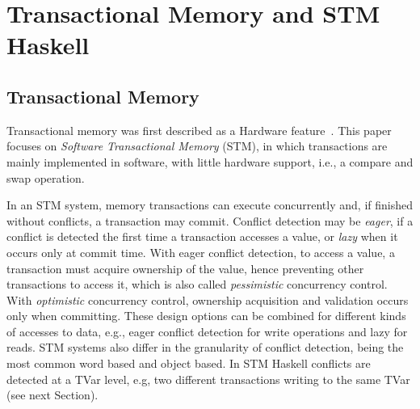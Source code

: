 \documentclass{llncs}
\begin{document}










\section{Transactional Memory and STM Haskell}
\label{sec:stm}
\subsection{Transactional Memory}

Transactional memory was first described as a Hardware feature~\cite{htm}. This paper focuses on
{\it Software Transactional Memory} (STM), in which transactions are mainly implemented
in software, with little hardware support, i.e., a compare and swap operation. 

In an STM system, memory transactions can execute concurrently and, if finished without conflicts, a transaction may commit. 
Conflict detection may be {\it eager}, if a conflict is detected the first time a
transaction accesses a value, or {\it lazy} when it occurs only at commit time. With
eager conflict detection, to access a value, a transaction must acquire
ownership of the value, hence preventing other transactions to access it, which is also called
{\it pessimistic} concurrency control. With {\it optimistic} concurrency control, ownership acquisition and
validation occurs only when committing. These design options can be combined for different kinds of accesses
to data, e.g., eager conflict detection for write operations and lazy for reads. 
STM systems also differ in the granularity of conflict detection,
 being the most common word based and object based. In STM Haskell conflicts are detected at a
TVar level, e.g, two different transactions writing to the same TVar (see next Section).
\end{document}
